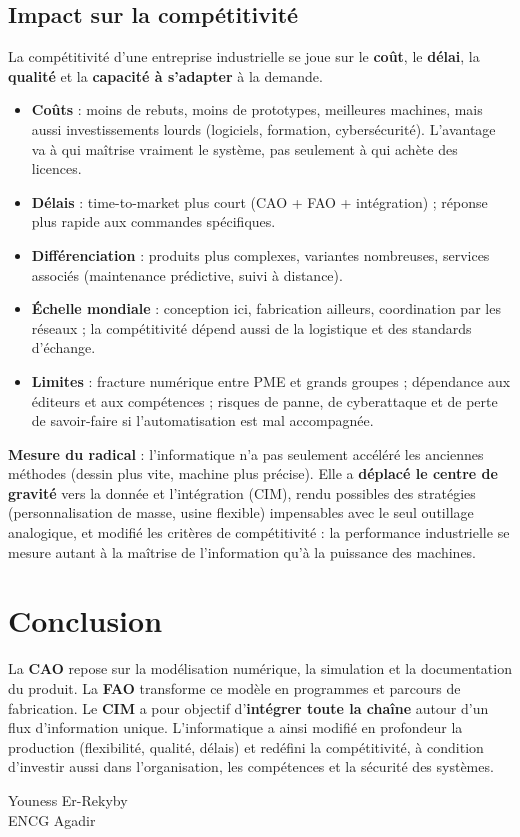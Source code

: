 \documentclass[12pt,a4paper]{article}
\begin{document}
\subsection{Impact sur la compétitivité}

La compétitivité d'une entreprise industrielle se joue sur le \textbf{coût}, le \textbf{délai}, la \textbf{qualité} et la \textbf{capacité à s'adapter} à la demande.

\begin{itemize}
  \item \textbf{Coûts} : moins de rebuts, moins de prototypes, meilleures machines, mais aussi investissements lourds (logiciels, formation, cybersécurité). L'avantage va à qui maîtrise vraiment le système, pas seulement à qui achète des licences.
  \item \textbf{Délais} : time-to-market plus court (CAO + FAO + intégration) ; réponse plus rapide aux commandes spécifiques.
  \item \textbf{Différenciation} : produits plus complexes, variantes nombreuses, services associés (maintenance prédictive, suivi à distance).
  \item \textbf{Échelle mondiale} : conception ici, fabrication ailleurs, coordination par les réseaux ; la compétitivité dépend aussi de la logistique et des standards d'échange.
  \item \textbf{Limites} : fracture numérique entre PME et grands groupes ; dépendance aux éditeurs et aux compétences ; risques de panne, de cyberattaque et de perte de savoir-faire si l'automatisation est mal accompagnée.
\end{itemize}

\textbf{Mesure du \guillemotleft{} radical \guillemotright{}} : l'informatique n'a pas seulement accéléré les anciennes méthodes (dessin plus vite, machine plus précise). Elle a \textbf{déplacé le centre de gravité} vers la donnée et l'intégration (CIM), rendu possibles des stratégies (personnalisation de masse, usine flexible) impensables avec le seul outillage analogique, et modifié les critères de compétitivité : la performance industrielle se mesure autant à la maîtrise de l'information qu'à la puissance des machines.

\section*{Conclusion}

La \textbf{CAO} repose sur la modélisation numérique, la simulation et la documentation du produit. La \textbf{FAO} transforme ce modèle en programmes et parcours de fabrication. Le \textbf{CIM} a pour objectif d'\textbf{intégrer toute la chaîne} autour d'un flux d'information unique. L'informatique a ainsi modifié en profondeur la production (flexibilité, qualité, délais) et redéfini la compétitivité, à condition d'investir aussi dans l'organisation, les compétences et la sécurité des systèmes.

\vspace{1.2cm}
\begin{flushright}
Youness Er-Rekyby\\
ENCG Agadir
\end{flushright}
\end{document}
